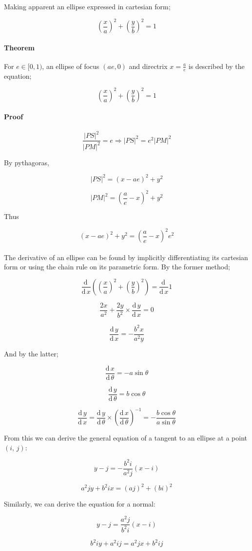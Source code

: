 \documentclass{article}
\newcommand{\de}{\textrm{d}\,}
\begin{document}
\noindent Making apparent an ellipse expressed in cartesian form;

\[\left(\frac{x}{a}\right)^2 + \left(\frac{y}{b}\right)^2 = 1\]

\paragraph{Theorem} For $e \in [0,1)$, an ellipse of focus $(ae, 0)$ and
directrix $x = \frac{a}{e}$ is described by the equation;

\[\left(\frac{x}{a}\right)^2 + \left(\frac{y}{b}\right)^2 = 1\]

\paragraph{Proof} 

\[\frac{|PS|^2}{|PM|^2} = e \Rightarrow |PS|^2 = e^2|PM|^2\]

\noindent By pythagoras,

\[|PS|^2 = \left(x - ae\right)^2 + y^2\]

\[|PM|^2 = \left(\frac{a}{e} - x\right)^2 + y^2\]

\noindent Thus

\[\left(x - ae\right)^2 + y^2 = \left(\frac{a}{e} - x\right)^2e^2\]\\

\noindent The derivative of an ellipse can be found by implicitly
differentiating its cartesian form or using the chain rule on its parametric
form. By the former method;

\[\frac{\de}{\de x} \left(\left(\frac{x}{a}\right)^2 +
\left(\frac{y}{b}\right)^2\right) = \frac{\de}{\de x}1\]

\[\frac{2x}{a^2} + \frac{2y}{b^2} \times \frac{\de y}{\de x} = 0\]

\[\frac{\de y}{\de x} = -\frac{b^2x}{a^2y}\]

\noindent And by the latter;

\[\frac{\de x}{\de \theta} = -a\sin\theta\]

\[\frac{\de y}{\de \theta} = b\cos\theta\]

\[\frac{\de y}{\de x} = \frac{\de y}{\de \theta} \times \left(\frac{\de x}{\de
\theta}\right)^{-1} = -\frac{b\cos\theta}{a\sin\theta}\]

\noindent From this we can derive the general equation of a tangent to an
ellipse at a point $\left(i,\, j\right)$:

\[y - j = -\frac{b^2i}{a^2j}\left(x - i\right)\]

\[a^2jy + b^2ix = \left(aj\right)^2 + \left(bi\right)^2\]

\noindent Similarly, we can derive the equation for a normal:

\[y - j = \frac{a^2j}{b^2i}\left(x - i\right)\]

\[b^2iy + a^2ij = a^2jx + b^2ij\]
\end{document}
